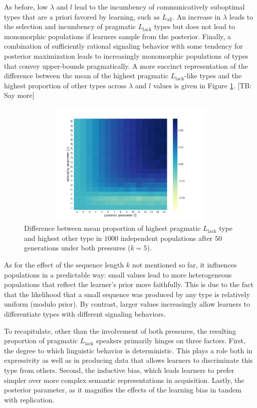 \documentclass[a4paper]{article}
\newcommand{\tb}[1]{\textcolor[rgb]{.8,.33,.0}{[TB: #1]}}%
\newcommand{\mylang}[1]{\ensuremath{L_{\text{#1}}}\xspace} %
\newcommand{\Lall}{\mylang{all}}
\newcommand{\Llack}{\mylang{lack}}
\begin{document}
As before, low $\lambda$ and $l$ lead to the incumbency of communicatively suboptimal types that are a priori favored by learning, such as $\Lall$. An increase in $\lambda$ leads to the selection and incumbency of pragmatic $\Llack$ types but does not lead to monomorphic populations if learners sample from the posterior. Finally, a combination of sufficiently rational signaling behavior with some tendency for posterior maximization leads to increasingly monomorphic populations of types that convey upper-bounds pragmatically. A more succinct representation of the difference between the mean of the highest pragmatic $\Llack$-like types and the highest proportion of other types across $\lambda$ and $l$ values is given in Figure \ref{fig:diff}. \tb{Say more}

\begin{figure}
\centering
\includegraphics[width=1\textwidth,height=6cm,keepaspectratio]{./plots/fig4-incumbents-difference}
\caption{Difference between mean proportion of highest pragmatic $\Llack$ type and highest other type in $1000$ independent populations after $50$ generations under both pressures ($k = 5$).}
\label{fig:diff}
\end{figure}

As for the effect of the sequence length $k$ not mentioned so far, it influences populations in a predictable way: small values lead to more heterogeneous populations that reflect the learner's prior more faithfully. This is due to the fact that the likelihood that a small sequence was produced by any type is relatively uniform (modulo prior). By contrast, larger values increasingly allow learners to differentiate types with different signaling behaviors.

To recapitulate, other than the involvement of both pressures, the resulting proportion of pragmatic $\Llack$ speakers primarily hinges on three factors. First, the degree to which linguistic behavior is deterministic. This plays a role both in expressivity as well as in producing data that allows learners to discriminate this type from others. Second, the inductive bias, which leads learners to prefer simpler over more complex semantic representations in acquisition. Lastly, the posterior parameter, as it magnifies the effects of the learning bias in tandem with replication. 
\end{document}
